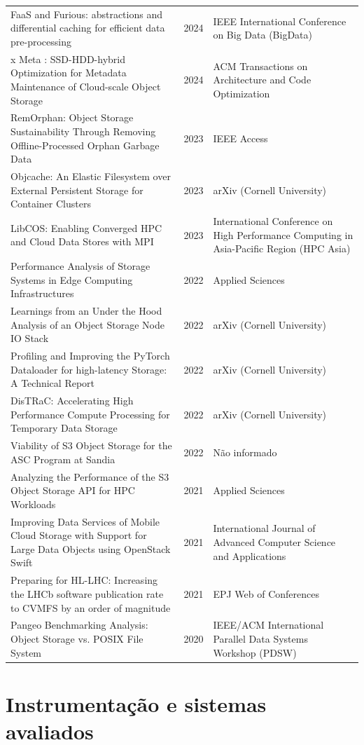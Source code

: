 {\begin{longtable}{@{}p{8.2cm}cp{4.4cm}@{}}
FaaS and Furious: abstractions and differential caching for efficient data pre-processing & 2024 & IEEE International Conference on Big Data (BigData) \\
x Meta : SSD-HDD-hybrid Optimization for Metadata Maintenance of Cloud-scale Object Storage & 2024 & ACM Transactions on Architecture and Code Optimization \\
RemOrphan: Object Storage Sustainability Through Removing Offline-Processed Orphan Garbage Data & 2023 & IEEE Access \\
Objcache: An Elastic Filesystem over External Persistent Storage for Container Clusters & 2023 & arXiv (Cornell University) \\
LibCOS: Enabling Converged HPC and Cloud Data Stores with MPI & 2023 & International Conference on High Performance Computing in Asia-Pacific Region (HPC Asia) \\
Performance Analysis of Storage Systems in Edge Computing Infrastructures & 2022 & Applied Sciences \\
Learnings from an Under the Hood Analysis of an Object Storage Node IO Stack & 2022 & arXiv (Cornell University) \\
Profiling and Improving the PyTorch Dataloader for high-latency Storage: A Technical Report & 2022 & arXiv (Cornell University) \\
DisTRaC: Accelerating High Performance Compute Processing for Temporary Data Storage & 2022 & arXiv (Cornell University) \\
Viability of S3 Object Storage for the ASC Program at Sandia & 2022 & Não informado \\
Analyzing the Performance of the S3 Object Storage API for HPC Workloads & 2021 & Applied Sciences \\
Improving Data Services of Mobile Cloud Storage with Support for Large Data Objects using OpenStack Swift & 2021 & International Journal of Advanced Computer Science and Applications \\
Preparing for HL-LHC: Increasing the LHCb software publication rate to CVMFS by an order of magnitude & 2021 & EPJ Web of Conferences \\
Pangeo Benchmarking Analysis: Object Storage vs. POSIX File System & 2020 & IEEE/ACM International Parallel Data Systems Workshop (PDSW) \\
\end{longtable}
}

\section{Instrumentação e sistemas avaliados}
\label{sec:ap-instrumentacao}

